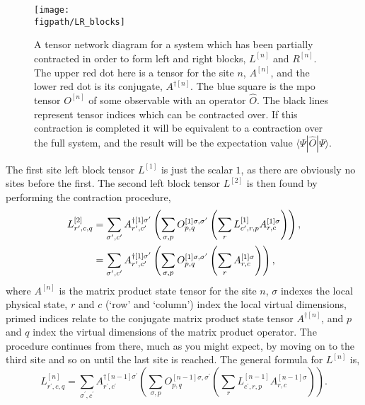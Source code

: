 \begin{figure}[ht!]
\centering
\texttt{[image: \\figpath/LR\_blocks]}
\caption{A tensor network diagram for a system which has been partially contracted in order to form left and right blocks, \(L^{[n]}\) and \(R^{[n]}\). The upper red dot here is a tensor for the site \(n\), \(A^{[n]}\), and the lower red dot is its conjugate, \(A^{\dagger [n]}\). The blue square is the mpo tensor \(O^{[n]}\) of some observable with an operator \(\hat{O}\). The black lines represent tensor indices which can be contracted over. If this contraction is completed it will be equivalent to a contraction over the full system, and the result will be the expectation value \(\langle \Psi | \hat{O} | \Psi \rangle \).}
\label{fig:vs1-2}
\end{figure}

The first site left block tensor \(L^{[1]}\) is just the scalar \(1\), as there are obviously no sites before the first. The second left block tensor \(L^{[2]}\) is then found by performing the contraction procedure,
\begin{align}
L^{[2]}_{r^{\prime}, c, q} &= \sum_{\sigma^{\prime}, c^{\prime}} A^{\dagger [1] \sigma^{\prime}}_{r^{\prime}, c^{\prime}} \left( \sum_{\sigma, p} O^{[1]  \sigma, \sigma^{\prime}}_{p, q} \left( \sum_{r} L^{[1]}_{c^{\prime}, r, p} A^{[1] \sigma}_{r, c} \right) \right), \notag \\
&= \sum_{\sigma^{\prime}, c^{\prime}} A^{\dagger [1] \sigma^{\prime}}_{r^{\prime}, c^{\prime}} \left( \sum_{\sigma, p} O^{[1]  \sigma, \sigma^{\prime}}_{p, q} \left( \sum_{r} A^{[1] \sigma}_{r, c} \right) \right),
\label{eq:vs1-3}
\end{align}
where \(A^{[n]}\) is the matrix product state tensor for the site \(n\), \(\sigma\) indexes the local physical state, \(r\) and \(c\) (`row' and `column') index the local virtual dimensions, primed indices relate to the conjugate matrix product state tensor \(A^{\dagger [n]}\), and \(p\) and \(q\) index the virtual dimensions of the matrix product operator. The procedure continues from there, much as you might expect, by moving on to the third site and so on until the last site is reached. The general formula for \(L^{[n]}\) is,
\begin{equation} 
L^{[n]}_{r^{\prime}, c, q} = \sum_{\sigma^{\prime}, c^{\prime}} A^{\dagger [n-1] \sigma^{\prime}}_{r^{\prime}, c^{\prime}} \left( \sum_{\sigma, p} O^{[n-1]  \sigma, \sigma^{\prime}}_{p, q} \left( \sum_{r} L^{[n-1]}_{c^{\prime}, r, p} A^{[n-1] \sigma}_{r, c} \right) \right).
\label{eq:vs1-4}
\end{equation}

